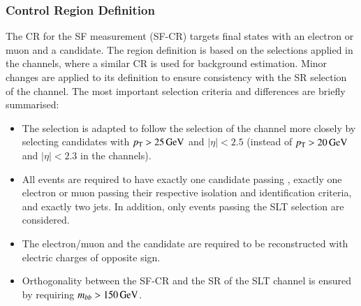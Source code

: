 \subsubsection{Control Region Definition}

The CR for the SF measurement (SF-CR) targets final states with an electron or
muon and a \tauhadvis candidate. The region definition is based on the
selections applied in the \lephad channels, where a similar CR is used for
\faketauhadvis background estimation. Minor changes are applied to its
definition to ensure consistency with the SR selection of the \hadhad
channel. The most important selection criteria and differences are briefly
summarised:
\begin{itemize}

\item The \tauhadvis selection is adapted to follow the selection of the \hadhad
  channel more closely by selecting candidates with $p_{\text{T}} > \SI{25}{\ensuremath{\text{GeV}}}$ and
  $|\eta| < \num{2.5}$ (instead of $\pT > \SI{20}{\GeV}$ and
  $|\eta| < \num{2.3}$ in the \lephad channels).

\item All events are required to have exactly one \tauhadvis candidate passing
  \tauid, exactly one electron or muon passing their respective isolation and
  identification criteria, and exactly two \btagged jets. In addition, only
  events passing the SLT selection are considered.

\item The electron/muon and the \tauhadvis candidate are required to be
  reconstructed with electric charges of opposite sign.

\item Orthogonality between the SF-CR and the SR of the \lephad SLT channel is
  ensured by requiring $m_{bb} > \SI{150}{\ensuremath{\text{GeV}}}$.

\end{itemize}


